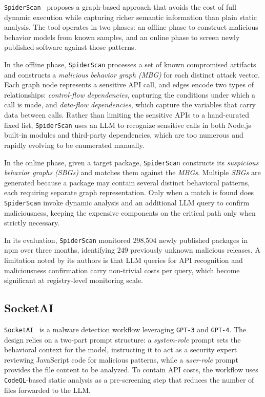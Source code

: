 \texttt{SpiderScan}~\cite{10.1145/3691620.3695492} proposes a graph-based approach that avoids the cost of full dynamic 
execution while capturing richer semantic information than plain static analysis. 
The tool operates in two phases: an offline phase to construct malicious behavior models from known samples, 
and an online phase to screen newly published software against those patterns.

In the offline phase, \texttt{SpiderScan} processes a set of known compromised artifacts and constructs a 
\emph{malicious behavior graph (MBG)} for each distinct attack vector. 
Each graph node represents a sensitive \ac{API} call, and edges encode two types of relationships: 
\emph{control-flow dependencies}, capturing the conditions under which a call is made, 
and \emph{data-flow dependencies}, which capture the variables that carry data between calls.
Rather than limiting the sensitive \acp{API} to a hand-curated fixed list, 
\texttt{SpiderScan} uses an \ac{LLM} to recognize sensitive calls in both Node.js built-in modules and third-party dependencies, 
which are too numerous and rapidly evolving to be enumerated manually.

In the online phase, given a target package, \texttt{SpiderScan} constructs its
\emph{suspicious behavior graphs (SBGs)} and matches them against the \emph{MBGs}.
Multiple \emph{SBGs} are generated because a package may contain several distinct
behavioral patterns, each requiring separate graph representation.
Only when a match is found does \texttt{SpiderScan} invoke dynamic analysis and an additional \ac{LLM} query to confirm maliciousness,
keeping the expensive components on the critical path only when strictly necessary.

In its evaluation, \texttt{SpiderScan} monitored 298,504 newly published packages in \ac{npm} over three months,
identifying 249 previously unknown malicious releases.
A limitation noted by its authors is that \ac{LLM} queries for \ac{API} recognition 
and maliciousness confirmation carry non-trivial costs per query, which become significant at registry-level monitoring scale.

\subsection{SocketAI}
\label{subsec:SocketAI}

\texttt{SocketAI}~\cite{zahan2025leveraginglargelanguagemodels} is a malware detection workflow leveraging \texttt{GPT-3} and \texttt{GPT-4}. 
The design relies on a two-part prompt structure:
a \emph{system-role} prompt sets the behavioral context for the model,
instructing it to act as a security expert reviewing JavaScript code for malicious patterns, 
while a \emph{user-role} prompt provides the file content to be analyzed. 
To contain \ac{API} costs, the workflow uses \texttt{CodeQL}-based static analysis as a
pre-screening step that reduces the number of files forwarded to the \ac{LLM}.

